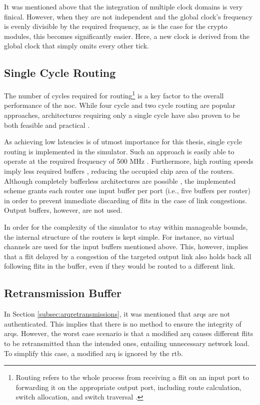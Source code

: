 It was mentioned above that the integration of multiple clock domains is very finical. However, when they are not independent and the global clock's
frequency is evenly divisible by the required frequency, as is the case for the crypto modules, this becomes significantly easier. Here, a new clock
is derived from the global clock that simply omits every other tick.

\subsection{Single Cycle Routing}\label{subsec:singlecyclerouting}
The number of cycles required for routing\footnote{Routing refers to the whole process from receiving a flit on an input port to forwarding it on the
appropriate output port, including route calculation, switch allocation, and switch traversal \cite[see][2]{routinglectureutah}.} is a key factor to the
overall performance of the \gls{noc}. While four cycle \cite[e.g.][]{routinglectureutah} and two cycle routing \cite[e.g.][]{lu11nocrouter} are
popular approaches, architectures requiring only a single cycle have also proven to be both feasible and practical
\cites{hayenga09scarab}{ved17routeonfly}.

As achieving low latencies is of utmost importance for this thesis, single cycle routing is implemented in the simulator. Such an approach is easily
able to operate at the required frequency of 500 MHz \cite[7]{hayenga09scarab}. Furthermore, high routing speeds imply less required buffers
\cite[1]{ved17routeonfly}, reducing the occupied chip area of the routers. Although completely bufferless architectures are possible
\cite{hayenga09scarab}, the implemented scheme grants each router one input buffer per port (i.e., five buffers per router) in order to prevent
immediate discarding of flits in the case of link congestions. Output buffers, however, are not used.

In order for the complexity of the simulator to stay within manageable bounds, the internal structure of the routers is kept simple. For instance, no
virtual channels are used for the input buffers mentioned above. This, however, implies that a flit delayed by a congestion of the targeted output
link also holds back all following flits in the buffer, even if they would be routed to a different link.

\subsection{Retransmission Buffer}
In Section \ref{subsec:arqretransmissions}, it was mentioned that \glspl{arq} are not authenticated. This implies that there is no method to ensure
the integrity of \glspl{arq}. However, the worst case scenario is that a modified \gls{arq} causes different flits to be retransmitted than the
intended ones, entailing unnecessary network load. To simplify this case, a modified \gls{arq} is ignored by the \gls{rtb}.

